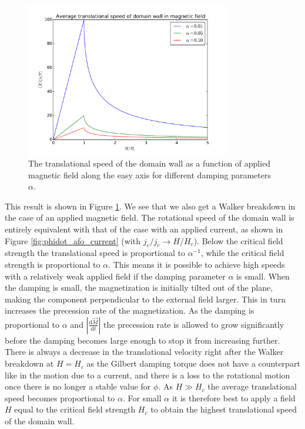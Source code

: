 \documentclass[12pt, a4paper, twoside, openright]{article}		%
\numberwithin{equation}{section}
\begin{document}
\begin{figure}[h!]
\begin{center}
\includegraphics[width=0.8\textwidth]{Figures/criticalField.pdf} 
\caption{The translational speed of the domain wall as a function of applied magnetic field along the easy axis for different damping parameters $\alpha$.}
\label{fig:criticalField} 
\end{center}
\end{figure}
This result is shown in Figure \ref{fig:criticalField}. We see that we also get a Walker breakdown in the case of an applied magnetic field. The rotational speed of the domain wall is entirely equivalent with that of the case with an applied current, as shown in Figure \ref{fig:phidot_afo_current} (with $j_e/j_c \rightarrow H/H_c$). Below the critical field strength the translational speed is proportional to $\alpha^{-1}$, while the critical field strength is proportional to $\alpha$. This means it is possible to achieve high speeds with a relatively weak applied field if the damping parameter $\alpha$ is small. When the damping is small, the magnetization is initially tilted out of the plane, making the component perpendicular to the external field larger. This in turn increases the precession rate of the magnetization. As the damping is proportional to $\alpha$ and $|\frac{\textrm{d} \vec{M}}{\textrm{d} t}|$ the precession rate is allowed to grow significantly before the damping becomes large enough to stop it from increasing further. There is always a decrease in the translational velocity right after the Walker breakdown at $H=H_c$ as the Gilbert damping torque does not have a counterpart like in the motion due to a current, and there is a loss to the rotational motion once there is no longer a stable value for $\phi$. As $H\gg H_c$ the average translational speed becomes proportional to $\alpha$. For small $\alpha$ it is therefore best to apply a field $H$ equal to the critical field strength $H_c$ to obtain the highest translational speed of the domain wall.
\end{document}
